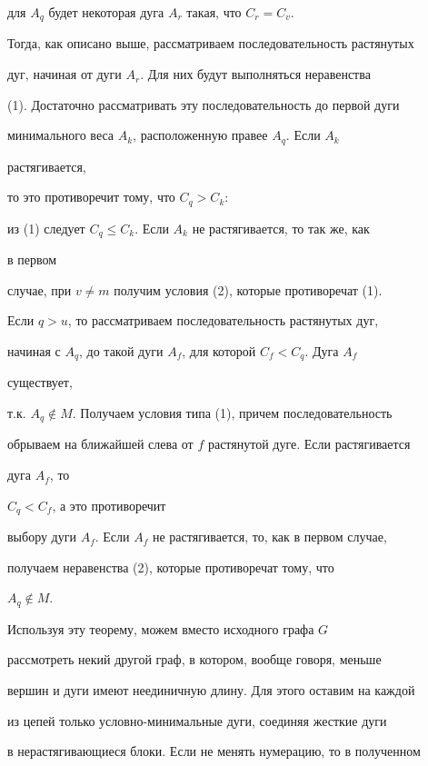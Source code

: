 \begin{pf}
для $A_q$ будет некоторая дуга $A_r$ такая, что $C_r=C_v$.


Тогда, как описано выше, рассматриваем последовательность растянутых


дуг, начиная от дуги $A_r$. Для них будут выполняться неравенства


(1). Достаточно рассматривать эту последовательность до первой дуги


минимального веса $A_k$, расположенную правее $A_q$. Если $A_k$


растягивается,


то это противоречит тому, что $C_q>C_k$:


из (1) следует $C_q\le C_k$. Если $A_k$ не растягивается, то так же, как


в первом


случае, при $v\ne m$ получим условия (2), которые противоречат (1).





Если $q>u$, то рассматриваем последовательность растянутых дуг,


начиная с $A_q$, до такой дуги $A_f$, для которой $C_f<C_q$. Дуга $A_f$


существует,


т.к. $A_q\notin M$. Получаем условия типа (1), причем последовательность


обрываем на ближайшей слева от $f$ растянутой дуге. Если растягивается


дуга $A_f$, то


$C_q<C_f$, а это противоречит


выбору дуги $A_f$. Если $A_f$ не растягивается, то, как в первом случае,


получаем неравенства (2), которые противоречат тому, что


$A_q\notin M$.


\end{pf}





Используя эту теорему, можем вместо исходного графа $G$


рассмотреть некий другой граф, в котором, вообще говоря, меньше


вершин и дуги имеют неединичную длину. Для этого оставим на каждой


из цепей только условно-минимальные дуги, соединяя жесткие дуги


в нерастягивающиеся блоки. Если не менять нумерацию, то в полученном



